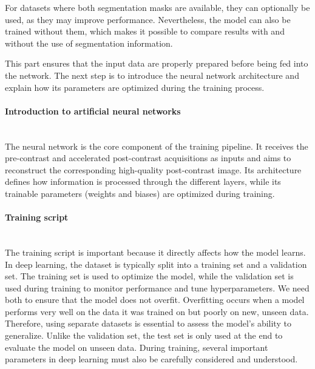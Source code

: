 \documentclass[12pt]{article}
\begin{document}
For datasets where both segmentation masks are available, they can optionally be used, as they may improve performance.
Nevertheless, the model can also be trained without them, which makes it possible to compare results with and without the use of segmentation information.
\vspace{0.5cm}

This part ensures that the input data are properly prepared before being fed into the network. 
The next step is to introduce the neural network architecture and explain how its parameters are optimized during the training process.

\paragraph{Introduction to artificial neural networks}
\mbox{}\\

The neural network is the core component of the training pipeline. 
It receives the pre-contrast and accelerated post-contrast acquisitions as inputs and aims to reconstruct the corresponding high-quality post-contrast image. 
Its architecture defines how information is processed through the different layers, while its trainable parameters (weights and biases) are optimized during training.

\paragraph{Training script}
\mbox{}\\

The training script is important because it directly affects how the model learns. In deep learning, the dataset is typically split into a training set and a validation set. 
The training set is used to optimize the model, while the validation set is used during training to monitor performance and tune hyperparameters. 
We need both to ensure that the model does not overfit. 
Overfitting occurs when a model performs very well on the data it was trained on but poorly on new, unseen data. 
Therefore, using separate datasets is essential to assess the model's ability to generalize.
Unlike the validation set, the test set is only used at the end to evaluate the model on unseen data.
During training, several important parameters in deep learning must also be carefully considered and understood.
\vspace{0.5cm}
\end{document}
